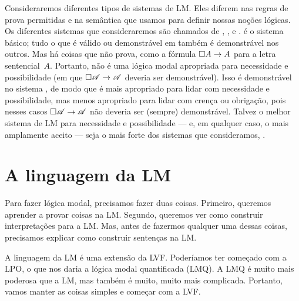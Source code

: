 Consideraremos diferentes tipos de sistemas de LM. Eles diferem nas regras de prova permitidas e na semântica que usamos para definir nossas noções lógicas. Os diferentes sistemas que consideraremos são chamados de \mlK, \mlT, \mlSfour{} e \mlSfive. \mlK{} é o sistema básico; tudo o que é válido ou demonstrável em \mlK{} também é demonstrável nos outros. Mas há coisas que \mlK{} não prova, como a fórmula $\Box A \rightarrow A$ para a letra sentencial~$A$. Portanto, \mlK{} não é uma lógica modal apropriada para necessidade e possibilidade (em que $\Box\mathscr{A} \rightarrow \mathscr{A}$ deveria ser demonstrável). Isso é demonstrável no sistema \mlT, de modo que \mlT{} é mais apropriado para lidar com necessidade e possibilidade, mas menos apropriado para lidar com crença ou obrigação, pois nesses casos $\Box\mathscr{A} \rightarrow \mathscr{A}$ não deveria ser (sempre) demonstrável. Talvez o melhor sistema de LM para necessidade e possibilidade — e, em qualquer caso, o mais amplamente aceito — seja o mais forte dos sistemas que consideramos, \mlSfive.

\section{A linguagem da LM}
\label{TFLtoML}

Para fazer lógica modal, precisamos fazer duas coisas. Primeiro, queremos aprender a provar coisas na LM. Segundo, queremos ver como construir interpretações para a LM. Mas, antes de fazermos qualquer uma dessas coisas, precisamos explicar como construir sentenças na LM.

A linguagem da LM é uma extensão da LVF. Poderíamos ter começado com a LPO, o que nos daria a lógica modal quantificada (LMQ). A LMQ é muito mais poderosa que a LM, mas também é muito, muito mais complicada. Portanto, vamos manter as coisas simples e começar com a LVF.

